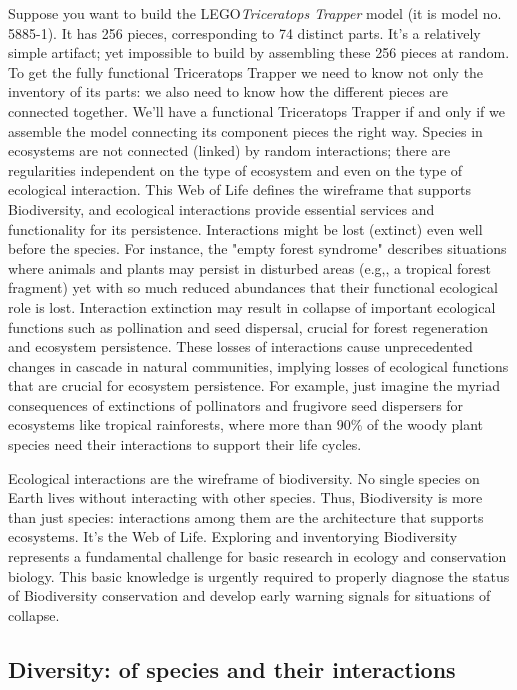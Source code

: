\documentclass[10pt,letterpaper]{article}
\begin{document}
Suppose you want to build the LEGO\circledR \textit{Triceratops Trapper} model (it is model no. 5885-1). It has 256 pieces, corresponding to 74 distinct parts. It's a relatively simple artifact; yet impossible to build by assembling these 256 pieces at random. To get the fully functional Triceratops Trapper we need to know not only the inventory of its parts: we also need to know how the different pieces are connected together. We'll have a functional Triceratops Trapper if and only if we assemble the model connecting its component pieces the right way. Species in ecosystems are not connected (linked) by random interactions; there are regularities independent on the type of ecosystem and even on the type of ecological interaction. This Web of Life \cite{Thompson:2009} defines the wireframe that supports Biodiversity, and ecological interactions provide essential services and functionality for its persistence. Interactions might be lost (extinct) even well before the species. For instance, the "empty forest syndrome" \cite{Redford:1992} describes situations where animals and plants may persist in disturbed areas (e.g,, a tropical forest fragment) yet with so much reduced abundances that their functional ecological role is lost. Interaction extinction may result in collapse of important ecological functions such as pollination and seed dispersal, crucial for forest regeneration and ecosystem persistence. These losses of interactions cause unprecedented changes in cascade in natural communities, implying losses of ecological functions that are crucial for ecosystem persistence. For example, just imagine the myriad consequences of extinctions of pollinators and frugivore seed dispersers for ecosystems like tropical rainforests, where more than 90\% of the woody plant species need their interactions to support their life cycles. 

Ecological interactions are the wireframe of biodiversity. No single species on Earth lives without interacting with other species. Thus, Biodiversity is more than just species: interactions among them are the architecture that supports ecosystems. It’s the Web of Life. Exploring and inventorying Biodiversity represents a fundamental challenge for basic research in ecology and conservation biology. This basic knowledge is urgently required to properly diagnose the status of Biodiversity conservation and develop early warning signals for situations of collapse. 

\subsection*{Diversity: of species and their interactions}
\end{document}
